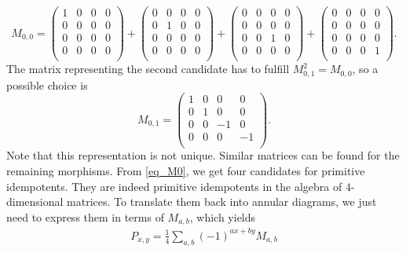 	\begin{equation}
	\label{eq_M0}
		M_{0,0}=
		\begin{pmatrix}
		1 & 0 & 0 & 0\\
		0 & 0 & 0 & 0\\
		0 & 0 & 0 & 0\\
		0 & 0 & 0 & 0\\
		\end{pmatrix}
		+\begin{pmatrix}
		0 & 0 & 0 & 0\\
		0 & 1 & 0 & 0\\
		0 & 0 & 0 & 0\\
		0 & 0 & 0 & 0\\
		\end{pmatrix}
		+
		\begin{pmatrix}
		0 & 0 & 0 & 0\\
		0 & 0 & 0 & 0\\
		0 & 0 & 1 & 0\\
		0 & 0 & 0 & 0\\
		\end{pmatrix}
		+\begin{pmatrix}
		0 & 0 & 0 & 0\\
		0 & 0 & 0 & 0\\
		0 & 0 & 0 & 0\\
		0 & 0 & 0 & 1\\
		\end{pmatrix}
		.
	\end{equation}
The matrix representing the second candidate has to fulfill $M_{0,1}^2=M_{0,0}$, so a possible choice is
	\begin{equation}
		M_{0,1}=\begin{pmatrix}
			1 & 0 & 0 & 0\\
			0 & 1 & 0 & 0\\
			0 & 0 & -1 & 0\\
			0 & 0 & 0 & -1\\
		\end{pmatrix}.
	\end{equation}
	Note that this representation is not unique. Similar matrices can be found for the remaining morphisms.
From \eqref{eq_M0}, we get four candidates for primitive idempotents. They are indeed primitive idempotents in the algebra of $4$-dimensional matrices. To translate them back into annular diagrams, we just need to express them in terms of $M_{a,b}$, which yields
	\begin{align}
	P_{x,y}=\frac{1}{4}\sum_{a,b}(-1)^{ax+by}M_{a,b}
	\end{align}
